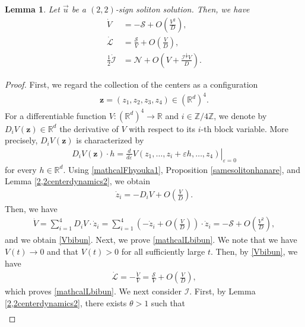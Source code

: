 \documentclass[reqno]{amsart}
\theoremstyle{plain}
\newtheorem{lemma}[theorem]{Lemma}
\theoremstyle{definition}
\numberwithin{equation}{section}
\begin{document}
\begin{lemma}\label{mathcalbibunlem}
Let $\vec{u}$ be a $(2,2)$-sign soliton solution. Then, we have
\begin{align}
\dot{V}&=-\mathcal{S}+O\left(\frac{V^2}{D}\right),\label{Vbibun}
\\
\dot{\mathcal{L}}&=\frac{\mathcal{S}}{V}+O\left(\frac{V}{D}\right),\label{mathcalLbibun}
\\
\frac{1}{2}\dot{\mathcal{I}}&=\mathcal{N}+O\left(V+\frac{\mathcal{I}^{\frac{1}{2}}V}{D}\right).\label{mathcalIbibun}
\end{align}
\end{lemma}
\begin{proof}
First, we regard the collection of the centers as a configuration
\begin{align*}
\boldsymbol{z}
=(z_1,z_2,z_3,z_4)\in(\mathbb{R}^d)^4.
\end{align*}
For a differentiable function $V:(\mathbb{R}^d)^4\to\mathbb{R}$ and $i\in\mathbb{Z}/4\mathbb{Z}$, we denote by $D_iV(\boldsymbol{z})\in\mathbb{R}^d$ the derivative of $V$ with respect to its $i$-th block variable. More precisely, $D_iV(\boldsymbol{z})$ is characterized by
\begin{align}\label{DiVdef}
D_iV(\boldsymbol{z})\cdot h
=
\left.
\frac{d}{d\varepsilon}
V(z_1,\ldots,z_i+\varepsilon h,\ldots,z_4)
\right|_{\varepsilon=0}
\end{align}
for every $h\in\mathbb{R}^d$. Using \eqref{mathcalFhyouka1}, Proposition \ref{samesolitonhanare},
and Lemma \ref{2,2centerdynamics2}, we obtain
\begin{align}
\dot{z}_i=-D_iV+O\left(\frac{V}{D}\right).
\end{align}
Then, we have
\begin{align*}
\dot{V}=\sum_{i=1}^4D_iV\cdot \dot{z}_i=\sum_{i=1}^4 \left(-\dot{z}_i+O\left(\frac{V}{D}\right)\right)\cdot \dot{z}_i=-\mathcal{S}+O\left(\frac{V^2}{D}\right),
\end{align*}
and we obtain \eqref{Vbibun}. Next, we prove \eqref{mathcalLbibun}. We note that we have $V(t)\to 0$ and that $V(t)>0$ for all sufficiently large $t$. Then, by \eqref{Vbibun}, we have
\begin{align*}
\dot{\mathcal{L}}=-\frac{\dot{V}}{V}=\frac{\mathcal{S}}{V}+O\left(\frac{V}{D}\right),
\end{align*}
which proves \eqref{mathcalLbibun}. We next consider $\mathcal{I}$. First, by Lemma \ref{2,2centerdynamics2}, there exists $\theta>1$ such that 
\begin{align*}

\end{align*}
\end{proof}
\end{document}
